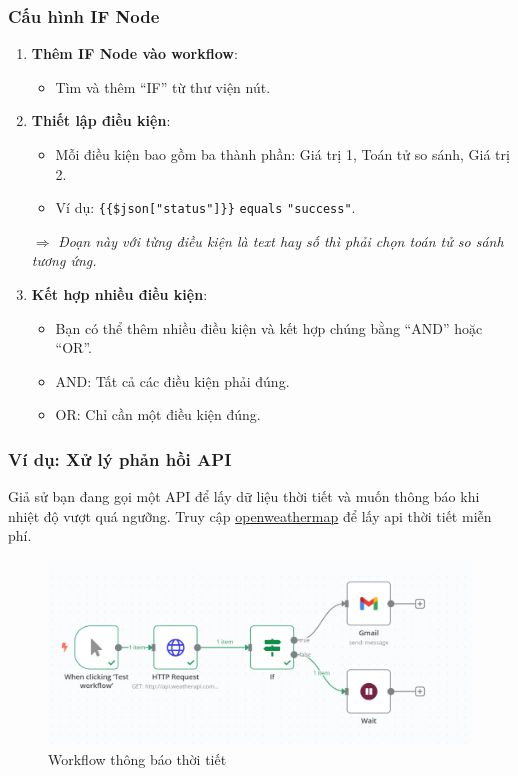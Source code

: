 \newpage

\subsubsection{Cấu hình IF Node}

\begin{enumerate}
  \item \textbf{Thêm IF Node vào workflow}:
  \begin{itemize}
    \item Tìm và thêm ``IF'' từ thư viện nút.
  \end{itemize}

  \item \textbf{Thiết lập điều kiện}:
  \begin{itemize}
    \item Mỗi điều kiện bao gồm ba thành phần: Giá trị 1, Toán tử so sánh, Giá trị 2.
    \item Ví dụ: \texttt{\{\{\$json["status"]\}\}} \texttt{equals} \texttt{"success"}.
  \end{itemize}
$\Rightarrow$  \textit{Đoạn này với từng điều kiện là text hay số thì phải chọn toán tử so sánh tương ứng.}
  \item \textbf{Kết hợp nhiều điều kiện}:
  \begin{itemize}
    \item Bạn có thể thêm nhiều điều kiện và kết hợp chúng bằng ``AND'' hoặc ``OR''.
    \item AND: Tất cả các điều kiện phải đúng.
    \item OR: Chỉ cần một điều kiện đúng.
  \end{itemize}
\end{enumerate}

\subsubsection{Ví dụ: Xử lý phản hồi API}

Giả sử bạn đang gọi một API để lấy dữ liệu thời tiết và muốn thông báo khi nhiệt độ vượt quá ngưỡng. Truy cập \href{https://www.weatherapi.com/my/}{openweathermap} để lấy api thời tiết miễn phí. 

\begin{figure}[htbp]
    \centering
    \includegraphics[width=1\linewidth]{Chap1-7/weather.pdf}
    \caption{Workflow thông báo thời tiết}
\end{figure} 

